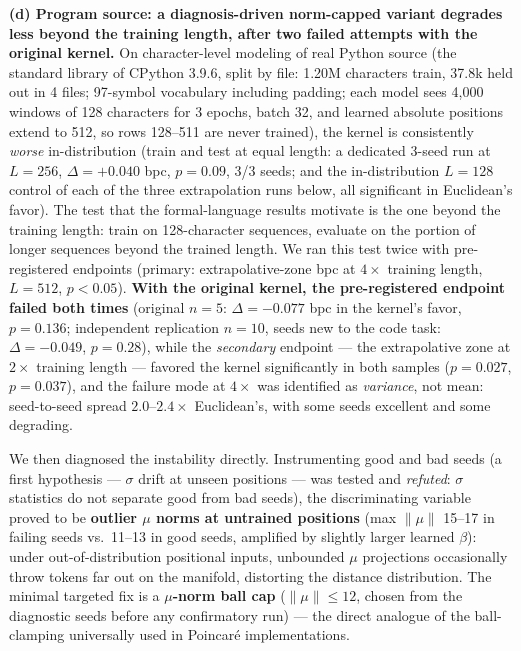 \documentclass[11pt]{article}
\begin{document}
\textbf{(d) Program source: a diagnosis-driven norm-capped variant degrades less beyond the training length, after two failed attempts with the original kernel.} On character-level modeling of real Python source (the standard library of CPython 3.9.6, split by file: 1.20M characters train, 37.8k held out in 4 files; 97-symbol vocabulary including padding; each model sees 4,000 windows of 128 characters for 3 epochs, batch 32, and learned absolute positions extend to 512, so rows 128--511 are never trained), the kernel is consistently \emph{worse} in-distribution (train and test at equal length: a dedicated 3-seed run at $L{=}256$, $\Delta = +0.040$ bpc, $p = 0.09$, 3/3 seeds; and the in-distribution $L{=}128$ control of each of the three extrapolation runs below, all significant in Euclidean's favor). The test that the formal-language results motivate is the one beyond the training length: train on 128-character sequences, evaluate on the portion of longer sequences beyond the trained length. We ran this test twice with pre-registered endpoints (primary: extrapolative-zone bpc at $4\times$ training length, $L{=}512$, $p<0.05$). \textbf{With the original kernel, the pre-registered endpoint failed both times} (original $n{=}5$: $\Delta = -0.077$ bpc in the kernel's favor, $p = 0.136$; independent replication $n{=}10$, seeds new to the code task: $\Delta = -0.049$, $p = 0.28$), while the \emph{secondary} endpoint --- the extrapolative zone at $2\times$ training length --- favored the kernel significantly in both samples ($p = 0.027$, $p = 0.037$), and the failure mode at $4\times$ was identified as \emph{variance}, not mean: seed-to-seed spread $2.0$--$2.4\times$ Euclidean's, with some seeds excellent and some degrading.

We then diagnosed the instability directly. Instrumenting good and bad seeds (a first hypothesis --- $\sigma$ drift at unseen positions --- was tested and \emph{refuted}: $\sigma$ statistics do not separate good from bad seeds), the discriminating variable proved to be \textbf{outlier $\mu$ norms at untrained positions} (max $\lVert\mu\rVert$ 15--17 in failing seeds vs.\ 11--13 in good seeds, amplified by slightly larger learned $\beta$): under out-of-distribution positional inputs, unbounded $\mu$ projections occasionally throw tokens far out on the manifold, distorting the distance distribution. The minimal targeted fix is a \textbf{$\mu$-norm ball cap} ($\lVert\mu\rVert \le 12$, chosen from the diagnostic seeds before any confirmatory run) --- the direct analogue of the ball-clamping universally used in Poincar\'e implementations.
\end{document}
